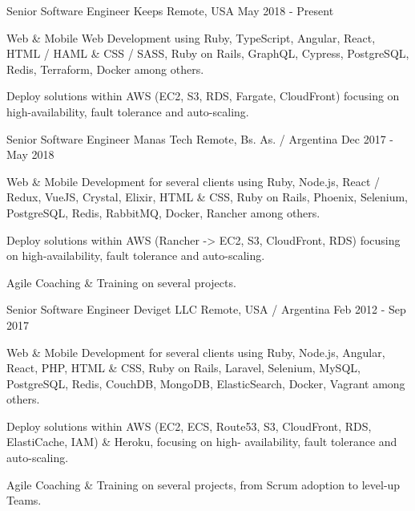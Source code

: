 
\begin{cventries}

  \cventry
    {Senior Software Engineer}
    {Keeps}
    {Remote, USA}
    {May 2018 - Present }
    {
      \begin{cvitems}
        \item {Web \& Mobile Web Development using Ruby, TypeScript, Angular, React, HTML / HAML \& CSS / SASS, Ruby on Rails, GraphQL, Cypress, PostgreSQL, Redis, Terraform, Docker among others.}
        \item {Deploy solutions within AWS (EC2, S3, RDS, Fargate, CloudFront) focusing on high-availability, fault tolerance and auto-scaling.}
      \end{cvitems}
    }
    
  \cventry
    {Senior Software Engineer}
    {Manas Tech}
    {Remote, Bs. As. / Argentina}
    {Dec 2017 - May 2018 }
    {
      \begin{cvitems}
        \item {Web \& Mobile Development for several clients using Ruby, Node.js, React / Redux, VueJS, Crystal, Elixir, HTML \& CSS, Ruby on Rails, Phoenix, Selenium, PostgreSQL, Redis, RabbitMQ, Docker, Rancher among others.}
        \item {Deploy solutions within AWS (Rancher -> EC2, S3, CloudFront, RDS) focusing on high-availability, fault tolerance and auto-scaling.}
        \item {Agile Coaching \& Training on several projects.}
      \end{cvitems}
    }

  \cventry
    {Senior Software Engineer}
    {Deviget LLC}
    {Remote, USA / Argentina}
    {Feb 2012 - Sep 2017}
    {
      \begin{cvitems}
        \item {Web \& Mobile Development for several clients using Ruby, Node.js, Angular, React, PHP, HTML \& CSS, Ruby on Rails, Laravel, Selenium, MySQL, PostgreSQL, Redis, CouchDB, MongoDB, ElasticSearch, Docker, Vagrant among others.}
        \item {Deploy solutions within AWS (EC2, ECS, Route53, S3, CloudFront, RDS, ElastiCache, IAM) \& Heroku, focusing on high- availability, fault tolerance and auto-scaling.}
        \item {Agile Coaching \& Training on several projects, from Scrum adoption to level-up Teams.}
      \end{cvitems}
    }


\end{cventries}
